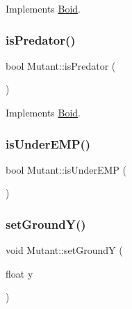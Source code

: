 Implements \hyperlink{class_boid_a58472dead1db1399b75090bf48184619}{Boid}.

\hypertarget{class_mutant_a3416c1b42eb1e02bdcd4066109a28812}{}\label{class_mutant_a3416c1b42eb1e02bdcd4066109a28812} 
\subsubsection{\texorpdfstring{is\+Predator()}{isPredator()}}
{\footnotesize\ttfamily bool Mutant\+::is\+Predator (\begin{DoxyParamCaption}{ }\end{DoxyParamCaption})\hspace{0.3cm}{\ttfamily [virtual]}}



Implements \hyperlink{class_boid_afdc731ff7d6b7f471c202c191c4abf77}{Boid}.

\hypertarget{class_mutant_a67fc6ef40353436d04d847f49254fa0b}{}\label{class_mutant_a67fc6ef40353436d04d847f49254fa0b} 
\subsubsection{\texorpdfstring{is\+Under\+E\+M\+P()}{isUnderEMP()}}
{\footnotesize\ttfamily bool Mutant\+::is\+Under\+E\+MP (\begin{DoxyParamCaption}{ }\end{DoxyParamCaption})}

\hypertarget{class_mutant_ac411f16b95e51f8e3c8c694425865785}{}\label{class_mutant_ac411f16b95e51f8e3c8c694425865785} 
\subsubsection{\texorpdfstring{set\+Ground\+Y()}{setGroundY()}}
{\footnotesize\ttfamily void Mutant\+::set\+GroundY (\begin{DoxyParamCaption}\item[{float}]{y }\end{DoxyParamCaption})}

\hypertarget{class_mutant_a69243115d28b18f3ac9803f66e8f8644}{}\label{class_mutant_a69243115d28b18f3ac9803f66e8f8644} 
